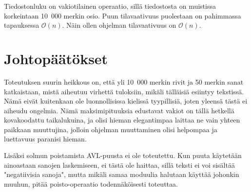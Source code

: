 \documentclass[12pt,a4paper,titlepage]{article}
\begin{document}
Tiedostonluku on vakiotilainen operaatio, sillä tiedostosta on muistissa korkeintaan 10~000 merkin osio. Puun tilavaativuus puolestaan on pahimmassa tapauksessa $\mathcal{O}(n)$. Näin ollen ohjelman tilavaativuus on $\mathcal{O}(n)$.

\section{Johtopäätökset}
Toteutuksen suurin heikkous on, että yli 10~000 merkin rivit ja 50 merkin sanat katkaistaan, mistä aiheutuu virhettä tuloksiin, mikäli tälläisiä esiintyy tekstissä. Nämä eivät kuitenkaan ole luonnollisissa kielissä tyypillisiä, joten yleensä tästä ei aiheudu ongelmia. Nämä maksimipituuksia edustavat vakiot on tällä hetkellä kovakoodattu taikalukuina, ja olisi hieman elegantimpaa laittaa ne vain yhteen paikkaan muuttujina, jolloin ohjelman muuttaminen olisi helpompaa ja luettavuus paranisi hieman.

Lisäksi solmun poistamista AVL-puusta ei ole toteutettu. Kun puuta käytetään ainoastaan sanojen laskemiseen, ei tästä ole haittaa, sillä teksti ei voi sisältää "negatiivisia sanoja", mutta mikäli samaa moduulia halutaan käyttää johonkin muuhun, pitää poisto-operaatio todennäköisesti toteuttaa.


\newpage

 
%
\end{document}
